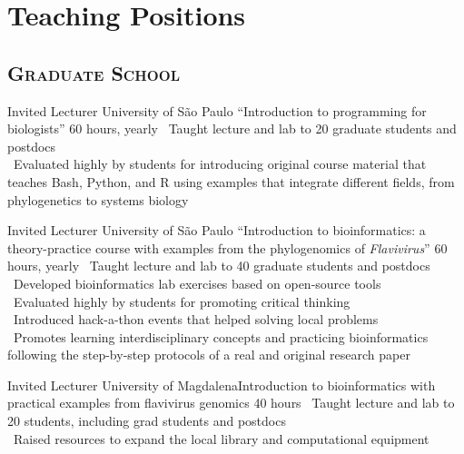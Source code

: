 \section{Teaching Positions}

\vspace{.5em}
	\subsection{\textsc{Graduate School}}
\vspace{.5em}

	{Invited Lecturer}
	{University of São Paulo}
	{``Introduction to programming for biologists''}
	{60 hours, yearly}
	{
		\textbullet~Taught lecture and lab to 20 graduate students and postdocs\\
		\textbullet~Evaluated highly by students for introducing original course material that teaches Bash, Python, and R using examples that integrate different fields, from phylogenetics to systems biology
	}

\vspace{.5em}

	{Invited Lecturer}
	{University of São Paulo}
	{``Introduction to bioinformatics: a theory-practice course with examples from the phylogenomics of \emph{Flavivirus}''}
	{60 hours, yearly}
	{
		\textbullet~Taught lecture and lab to 40 graduate students and postdocs\\
		\textbullet~Developed bioinformatics lab exercises based on open-source tools\\
		\textbullet~Evaluated highly by students for promoting critical thinking\\
		\textbullet~Introduced hack-a-thon events that helped solving local problems\\
		\textbullet~Promotes learning interdisciplinary concepts and practicing bioinformatics following the step-by-step protocols of a real and original research paper
	}

\vspace{.5em}

	{Invited Lecturer}
	{University of Magdalena}{Introduction to bioinformatics with practical examples from flavivirus genomics}
	{40 hours}
	{
		\textbullet~Taught lecture and lab to 20 students, including grad students and postdocs\\
		\textbullet~Raised resources to expand the local library and computational equipment
	}

